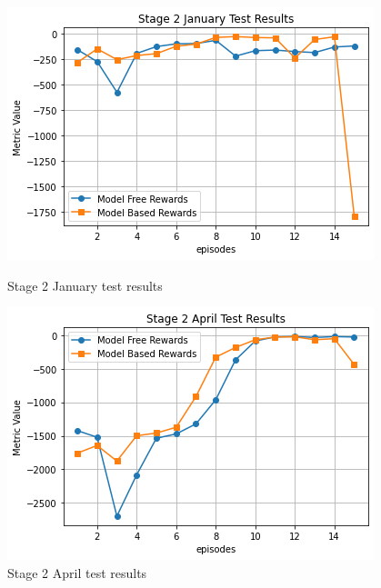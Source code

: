 \documentclass{article}
\begin{document}
\begin{figure}[H]
  \centering
  \begin{minipage}[t]{0.48\textwidth}
    \centering
    \includegraphics[width=\textwidth]{ExperimentResults/Stage_2_Jan_Test_Results.png}
    \caption{Stage 2 January test results}
    \label{fig:stage2-jan}
  \end{minipage}
  \hfill
  \begin{minipage}[t]{0.48\textwidth}
    \centering
    \includegraphics[width=\textwidth]{ExperimentResults/Stage_2_April_Test_Results.png}
    \caption{Stage 2 April test results}
    \label{fig:stage2-april}
  \end{minipage}

      \vspace{0.5em} %
  \begin{minipage}[t]{\textwidth}
    \small
     

\end{minipage}
\end{figure}
\end{document}
